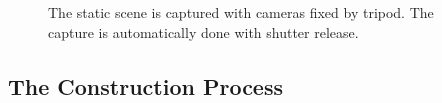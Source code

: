 \begin{figure}[t!]
{\begin{minipage}[t]{0.35\textwidth}
\end{minipage}
}\vspace{-3mm}
    \caption{The static scene is captured with cameras fixed by tripod. The capture is automatically done with shutter release.}
    \label{fig6-2}
\end{figure}

\subsection{The Construction Process}

